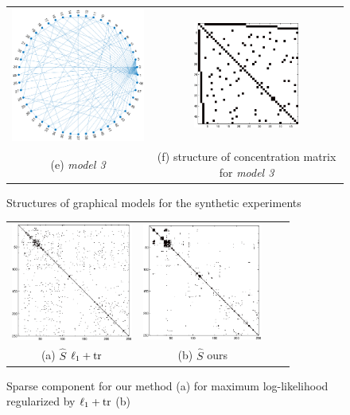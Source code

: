 \documentclass{article}
\def\tr{\rm tr}
\begin{document}
\begin{figure}
\begin{tabular}{cc}
      \includegraphics[width=6cm]{fig/diff_graph} 
  &   \includegraphics[width=3.5cm]{fig/diff_true}
   \\    (e) \textit{model 3} & (f)  structure of concentration matrix for \textit{model 3}
\end{tabular}
\caption{ Structures of graphical models for the synthetic experiments}
\end{figure}


\begin{figure}
\center
\begin{tabular}{cccc}
      \includegraphics[width=4cm]{fig/MILE_Som}
  &   \includegraphics[height=3.8cm]{fig/MILE_Ssl_ordered}
   \\   (a)  $\hat{S}$ $\ell_1+\tr$  & (b) $\hat{S}$ ours 
\end{tabular}
\caption{Sparse component for our method (a) for maximum log-likelihood regularized by $\ell_1+\tr$ (b) }
\end{figure}
\end{document}
